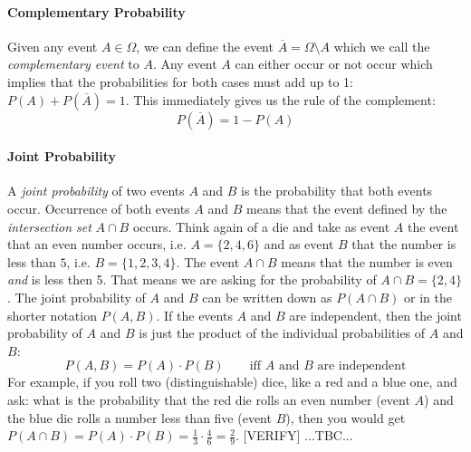 \paragraph{Complementary Probability}
Given any event $A \in \Omega$, we can define the event $\overline{A} = \Omega \setminus A$ which we call the \emph{complementary event} to $A$. Any event $A$ can either occur or not occur which implies that the probabilities for both cases must add up to 1: $P(A) + P(\overline{A}) = 1$. This immediately gives us the rule of the complement:
\begin{equation}
 P(\overline{A}) = 1 - P(A)
\end{equation}


\paragraph{Joint Probability}
A \emph{joint probability} of two events $A$ and $B$ is the probability that both events occur. Occurrence of both events $A$ and $B$ means that the event defined by the \emph{intersection set} $A \cap B$ occurs. Think again of a die and take as event $A$ the event that an even number occurs, i.e. $A = \{2,4,6\}$ and as event $B$ that the number is less than $5$, i.e. $B = \{1,2,3,4\}$. The event $A \cap B$ means that the number is even \emph{and} is less then 5. That means we are asking for the probability of $A \cap B = \{2,4\}$. The joint probability of $A$ and $B$ can be written down as $P(A \cap B)$ or in the shorter notation $P(A,B)$. If the events $A$ and $B$ are independent, then the joint probability of $A$ and $B$ is just the product of the individual probabilities of $A$ and $B$: 
\begin{equation}
 P(A, B) = P(A) \cdot P(B) \qquad \text{iff $A$ and $B$ are independent}
\end{equation}
For example, if you roll two (distinguishable) dice, like a red  and a blue one, and ask: what is the probability that the red die rolls an even number (event $A$) and the blue die rolls a number less than five (event $B$), then you would get $P(A \cap B) = P(A) \cdot P(B) = \frac{1}{3} \cdot \frac{4}{6} = \frac{2}{9}$. [VERIFY] ...TBC...




